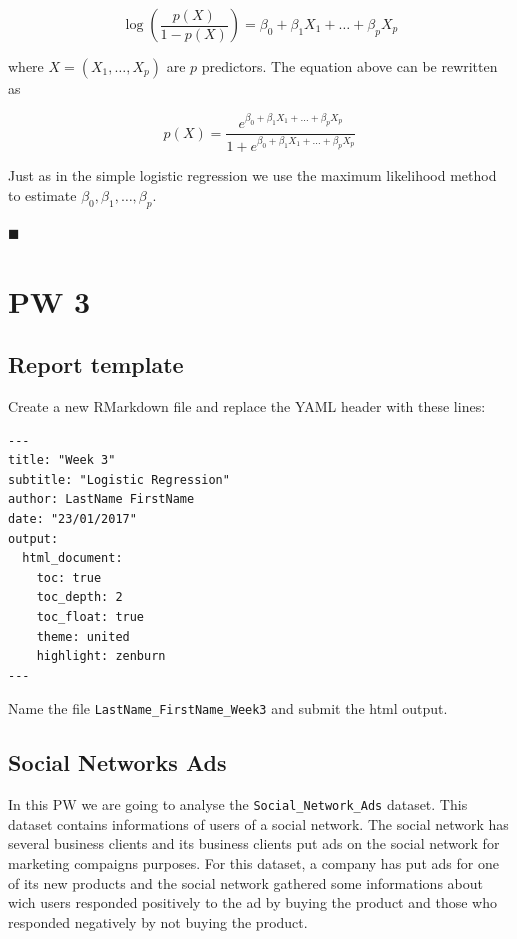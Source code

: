 \documentclass[]{book}
\begin{document}
\[ \log( \frac{p(X)}{1-p(X)} ) = \beta_0 + \beta_1 X_1 +  \ldots + \beta_p X_p\]

where \(X=(X_1,\ldots,X_p)\) are \(p\) predictors. The equation above
can be rewritten as

\[ p(X) = \frac{e^{\beta_0 + \beta_1 X_1 +  \ldots + \beta_p X_p}}{1+e^{\beta_0 + \beta_1 X_1 +  \ldots + \beta_p X_p}} \]

Just as in the simple logistic regression we use the maximum likelihood
method to estimate \(\beta_0,\beta_1,\ldots,\beta_p\).

◼

\chapter*{PW 3}\label{pw-3}

\section*{Report template}\label{report-template}

Create a new RMarkdown file and replace the YAML header with these
lines:

\begin{verbatim}
---
title: "Week 3"
subtitle: "Logistic Regression"
author: LastName FirstName
date: "23/01/2017"
output:
  html_document:
    toc: true
    toc_depth: 2
    toc_float: true
    theme: united
    highlight: zenburn
---
\end{verbatim}

Name the file \texttt{LastName\_FirstName\_Week3} and submit the html
output.

\section*{Social Networks Ads}\label{social-networks-ads}

In this PW we are going to analyse the \texttt{Social\_Network\_Ads}
dataset. This dataset contains informations of users of a social
network. The social network has several business clients and its
business clients put ads on the social network for marketing compaigns
purposes. For this dataset, a company has put ads for one of its new
products and the social network gathered some informations about wich
users responded positively to the ad by buying the product and those who
responded negatively by not buying the product.
\end{document}
